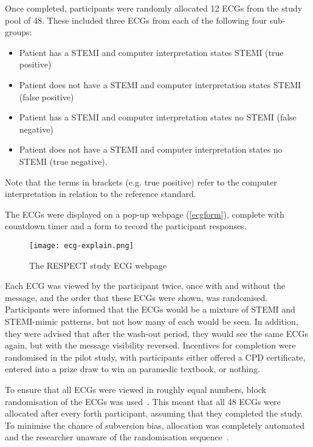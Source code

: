 Once completed, participants were randomly allocated 12 ECGs from the study pool of 48. These included three ECGs from each of the following four sub-groups:

\begin{itemize}
\item Patient has a STEMI and computer interpretation states STEMI (true positive)

\item Patient does not have a STEMI and computer interpretation states STEMI (false positive)

\item Patient has a STEMI and computer interpretation states no STEMI (false negative)

\item Patient does not have a STEMI and computer interpretation states no STEMI (true negative).

\end{itemize}

Note that the terms in brackets (e.g. true positive) refer to the computer interpretation in relation to the reference standard.

The ECGs were displayed on a pop-up webpage (\autoref{ecgform}), complete with countdown timer and a form to record the participant responses.

\begin{figure}[htbp]
\centering
\texttt{[image: ecg-explain.png]}
\caption{The RESPECT study ECG webpage}
\label{ecgform}
\end{figure}



Each ECG was viewed by the participant twice, once with and without the message, and the order that these ECGs were shown, was randomised. Participants were informed that the ECGs would be a mixture of STEMI and STEMI-mimic patterns, but not how many of each would be seen. In addition, they were advised that after the wash-out period, they would see the same ECGs again, but with the message visibility reversed. Incentives for completion were randomised in the pilot study, with participants either offered a CPD certificate, entered into a prize draw to win an paramedic textbook, or nothing.

To ensure that all ECGs were viewed in roughly equal numbers, block randomisation of the ECGs was used~\citep{sedgwick_block_2011}. This meant that all 48 ECGs were allocated after every forth participant, assuming that they completed the study. To minimise the chance of subversion bias, allocation was completely automated and the researcher unaware of the randomisation sequence~\citep{torgerson_designing_2008}.

